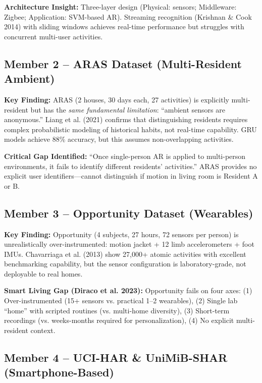 \documentclass[11pt, a4paper]{article}
\begin{document}
\textbf{Architecture Insight:} Three-layer design (Physical: sensors; Middleware: Zigbee; Application: SVM-based AR). Streaming recognition (Krishnan \& Cook 2014) with sliding windows achieves real-time performance but struggles with concurrent multi-user activities.

\subsection{Member 2 -- ARAS Dataset (Multi-Resident Ambient)}

\textbf{Key Finding:} ARAS (2 houses, 30 days each, 27 activities) is explicitly multi-resident but has the \textit{same fundamental limitation}: ``ambient sensors are anonymous.'' Liang et al. (2021) confirms that distinguishing residents requires complex probabilistic modeling of historical habits, not real-time capability. GRU models achieve 88\% accuracy, but this assumes non-overlapping activities.

\textbf{Critical Gap Identified:} ``Once single-person AR is applied to multi-person environments, it fails to identify different residents' activities.'' ARAS provides no explicit user identifiers---cannot distinguish if motion in living room is Resident A or B.

\subsection{Member 3 -- Opportunity Dataset (Wearables)}

\textbf{Key Finding:} Opportunity (4 subjects, 27 hours, 72 sensors per person) is unrealistically over-instrumented: motion jacket + 12 limb accelerometers + foot IMUs. Chavarriaga et al. (2013) show 27,000+ atomic activities with excellent benchmarking capability, but the sensor configuration is laboratory-grade, not deployable to real homes.

\textbf{Smart Living Gap (Diraco et al. 2023):} Opportunity fails on four axes: (1) Over-instrumented (15+ sensors vs. practical 1--2 wearables), (2) Single lab ``home'' with scripted routines (vs. multi-home diversity), (3) Short-term recordings (vs. weeks-months required for personalization), (4) No explicit multi-resident context.

\subsection{Member 4 -- UCI-HAR \& UniMiB-SHAR (Smartphone-Based)}
\end{document}
